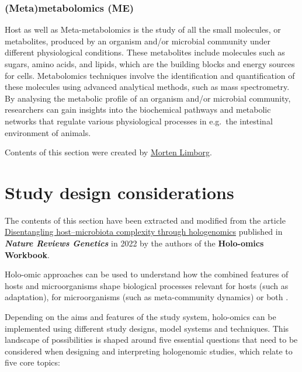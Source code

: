 \documentclass[
]{book}
\begin{document}
\hypertarget{meta-metabolomics}{%
\subsection*{(Meta)metabolomics (ME)}\label{meta-metabolomics}}

Host as well as Meta-metabolomics is the study of all the small molecules, or metabolites, produced by an organism and/or microbial community under different physiological conditions. These metabolites include molecules such as sugars, amino acids, and lipids, which are the building blocks and energy sources for cells. Metabolomics techniques involve the identification and quantification of these molecules using advanced analytical methods, such as mass spectrometry. By analysing the metabolic profile of an organism and/or microbial community, researchers can gain insights into the biochemical pathways and metabolic networks that regulate various physiological processes in e.g.~the intestinal environment of animals.

Contents of this section were created by \protect\hyperlink{morten-limborg}{Morten Limborg}.

\hypertarget{study-design-considerations}{%
\chapter{Study design considerations}\label{study-design-considerations}}

The contents of this section have been extracted and modified from the article \href{https://www.nature.com/articles/s41576-021-00421-0}{Disentangling host--microbiota complexity through hologenomics} published in \textbf{\emph{Nature Reviews Genetics}} in 2022 by the authors of the \textbf{Holo-omics Workbook}.

Holo-omic approaches can be used to understand how the combined features of hosts and microorganisms shape biological processes relevant for hosts (such as adaptation), for microorganisms (such as meta-community dynamics) or both \citep{Alberdi2022-ay}.

Depending on the aims and features of the study system, holo-omics can be implemented using different study designs, model systems and techniques. This landscape of possibilities is shaped around five essential questions that need to be considered when designing and interpreting hologenomic studies, which relate to five core topics:
\end{document}
